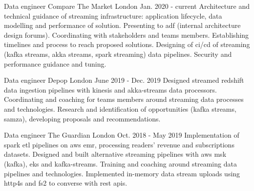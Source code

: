 
\newcommand*{\logo}[2]{\raisebox{-0.2em}{\texttt{[image: \#2]}}\hspace{0.25em}#1}

\begin{cventries}

  \cventry
    {Data engineer} %
    {\logo{\ctm Compare The Market}{../../../images/ctm.png}} %
    {London} %
    {Jan. 2020 - current} %
    {} %
    {
      Architecture and technical guidance of streaming infrastructure: application lifecycle, data modelling and performance of solution. 
      Presenting to adf (internal architecture design forums). Coordinating with stakeholders and teams members. Establishing timelines 
      and process to reach proposed solutions.
      Designing of ci/cd of streaming (kafka streams, akka streams, spark streaming) data pipelines.
      Security and performance guidance and tuning. 
    }

  

  \cventry
    {Data engineer} %
    {\logo{\depop Depop}{../../../images/depop.jpg}} %
    {London} %
    {June 2019 - Dec. 2019} %
    {}
    {
      Designed streamed redshift data ingestion pipelines with kinesis and akka-streams data processors. Coordinating and coaching for teams members
      around streaming data processes and technologies.
      Research and identification of opportunities (kafka streams, samza), developing proposals and recommendations.
    }

  \cventry
    {Data engineer} %
    {\logo{\guardian The Guardian}{../../../images/guardian.png}} %
    {London} %
    {Oct. 2018 - May 2019} %
    {} %
    {
Implementation of spark etl pipelines on aws emr, processing readers' revenue and subscriptions datasets. 
Designed and built alternative streaming pipelines with aws msk (kafka), eks and kafka-streams. Training and coaching around streaming data pipelines and technologies.
Implemented in-memory data stream uploads using http4s and fs2 to converse with rest apis.
    }


\end{cventries}
